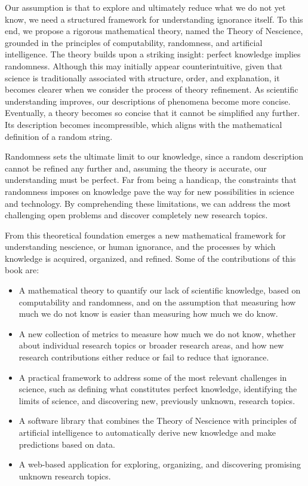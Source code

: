 Our assumption is that to explore and ultimately reduce what we do not yet know, we need a structured framework for understanding ignorance itself. To this end, we propose a rigorous mathematical theory, named the Theory of Nescience, grounded in the principles of computability, randomness, and artificial intelligence. The theory builds upon a striking insight: perfect knowledge implies randomness. Although this may initially appear counterintuitive, given that science is traditionally associated with structure, order, and explanation, it becomes clearer when we consider the process of theory refinement. As scientific understanding improves, our descriptions of phenomena become more concise.  Eventually, a theory becomes so concise that it cannot be simplified any further. Its description becomes incompressible, which aligns with the mathematical definition of a random string.

Randomness sets the ultimate limit to our knowledge, since a random description cannot be refined any further and, assuming the theory is accurate, our understanding must be perfect. Far from being a handicap, the constraints that randomness imposes on knowledge pave the way for new possibilities in science and technology. By comprehending these limitations, we can address the most challenging open problems and discover completely new research topics.

From this theoretical foundation emerges a new mathematical framework for understanding nescience, or human ignorance, and the processes by which knowledge is acquired, organized, and refined. Some of the contributions of this book are:

\medskip

\begin{itemize}
 
\item A mathematical theory to quantify our lack of scientific knowledge, based on computability and randomness, and on the assumption that measuring how much we do not know is easier than measuring how much we do know.

\item A new collection of metrics to measure how much we do not know, whether about individual research topics or broader research areas, and how new research contributions either reduce or fail to reduce that ignorance.

\item A practical framework to address some of the most relevant challenges in science, such as defining what constitutes perfect knowledge, identifying the limits of science, and discovering new, previously unknown, research topics.

\item A software library that combines the Theory of Nescience with principles of artificial intelligence to automatically derive new knowledge and make predictions based on data.

\item A web-based application for exploring, organizing, and discovering promising unknown research topics.

\end{itemize}

